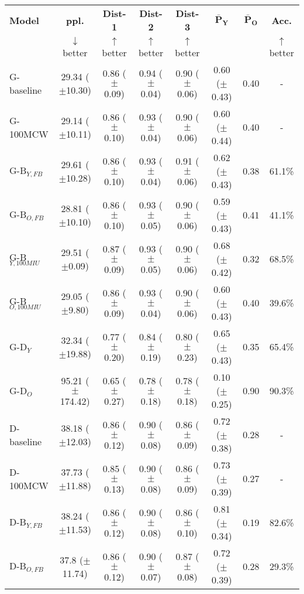 \begin{table*}[h]
    \centering
    \begin{tabular}{l | c c c c | c c c}
    \toprule
    \textbf{Model} & \textbf{ppl.} & \textbf{Dist-1} & \textbf{Dist-2} & \textbf{Dist-3} & $\boldsymbol{\bar{P}_Y}$ & $\boldsymbol{\bar{P}_O}$ & \textbf{Acc.}\\
     & $\downarrow$ better & $\uparrow$ better & $\uparrow$ better & $\uparrow$ better & & & $\uparrow$ better\\
    \midrule
    \midrule
    G-baseline & 29.34 ($\pm$10.30) & 0.86 ($\pm$0.09) & 0.94 ($\pm$0.04) & 0.90 ($\pm$0.06) & 0.60 ($\pm$0.43) & 0.40 & -\\
    G-100MCW & 29.14 ($\pm$10.11) & 0.86 ($\pm$0.10) & 0.93 ($\pm$0.04) & 0.90 ($\pm$0.06) & 0.60 ($\pm$0.44) & 0.40 & -\\
    \midrule
    G-B$_{Y, FB}$ & 29.61 ($\pm$10.28) & 0.86 ($\pm$0.10) & 0.93 ($\pm$0.04) & 0.91 ($\pm$0.06) & 0.62 ($\pm$0.43) & 0.38 & 61.1\%\\
    G-B$_{O, FB}$ & 28.81 ($\pm$10.10) & 0.86 ($\pm$0.10) & 0.93 ($\pm$0.05) & 0.90 ($\pm$0.06) & 0.59 ($\pm$0.43) & 0.41 & 41.1\%\\
    G-B$_{Y, 100MIU}$ & 29.51 ($\pm$0.09) & 0.87 ($\pm$0.09) & 0.93 ($\pm$0.05) & 0.90 ($\pm$0.06) & 0.68 ($\pm$0.42) & 0.32 & 68.5\%\\
    G-B$_{O, 100MIU}$ & 29.05 ($\pm$9.80) & 0.86 ($\pm$0.09) & 0.93 ($\pm$0.04) & 0.90 ($\pm$0.06) & 0.60 ($\pm$0.43) & 0.40 & 39.6\%\\
    \midrule
    G-D$_{Y}$ & 32.34 ($\pm$19.88) & 0.77 ($\pm$0.20) & 0.84 ($\pm$0.19) & 0.80 ($\pm$0.23) & 0.65 ($\pm$0.43) & 0.35 & 65.4\%\\
    G-D$_{O}$ & 95.21 ($\pm$174.42) & 0.65 ($\pm$0.27) & 0.78 ($\pm$0.18) & 0.78 ($\pm$0.18) & 0.10 ($\pm$0.25) & 0.90 & 90.3\%\\
    \midrule
    \midrule
    D-baseline & 38.18 ($\pm$12.03) & 0.86 ($\pm$0.12) & 0.90 ($\pm$0.08) & 0.86 ($\pm$0.09) & 0.72 ($\pm$0.38) & 0.28 & -\\
    D-100MCW & 37.73 ($\pm$11.88) & 0.85 ($\pm$0.13) & 0.90 ($\pm$0.08) & 0.86 ($\pm$0.09) & 0.73 ($\pm$0.39) & 0.27 & -\\
    \midrule
    D-B$_{Y, FB}$ & 38.24 ($\pm$11.53) & 0.86 ($\pm$0.12) & 0.90 ($\pm$0.08) & 0.86 ($\pm$0.10) & 0.81 ($\pm$0.34) & 0.19 & 82.6\%\\
    D-B$_{O, FB}$ & 37.8 ($\pm$11.74) & 0.86 ($\pm$0.12) & 0.90 ($\pm$0.07) & 0.87 ($\pm$0.08) & 0.72 ($\pm$0.39) & 0.28 & 29.3\%\\

\end{tabular}
\end{table*}
